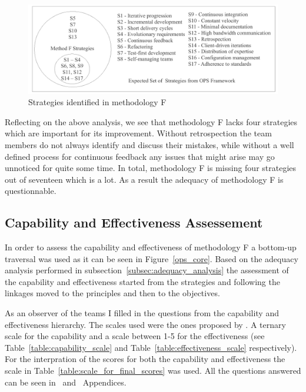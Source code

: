 \begin{figure}[H]
\centerline{\includegraphics[scale=0.9]{include/case_study/fig/companyF_strategies.pdf}}
\caption{Strategies identified in methodology F} 
\label{fig:companyF_strategies}
\end{figure}

Reflecting on the above analysis, we see that methodology F lacks four strategies which are important for its improvement. Without retrospection the team members do not always identify and discuss their mistakes, while without a well defined process for continuous feedback any issues that might arise may go unnoticed for quite some time. In total, methodology F is missing four strategies out of seventeen which is a lot. As a result the adequacy of methodology F is questionnable.

\subsection{Capability and Effectiveness Assessement}
In order to assess the capability and effectiveness of methodology F a bottom-up traversal was used as it can be seen in Figure~\ref{ops_core}. Based on the adequacy analysis performed in subsection~\ref{subsec:adequacy_analysis} the assessment of the capability and effectiveness started from the strategies and following the linkages moved to the principles and then to the objectives. 

As an observer of the teams I filled in the questions from the capability and effectiveness hierarchy. The scales used were the ones proposed by \citet{sventha_dissertation}. A ternary scale for the capability and a scale between 1-5 for the effectiveness (see Table~\ref{table:capability_scale} and  Table~\ref{table:effectiveness_scale} respectively). For the interpration of the scores for both the capability and effectiveness the scale in Table~\ref{table:scale_for_final_scores} was used. All the questions answered can be seen in~ and~ Appendices. \\

